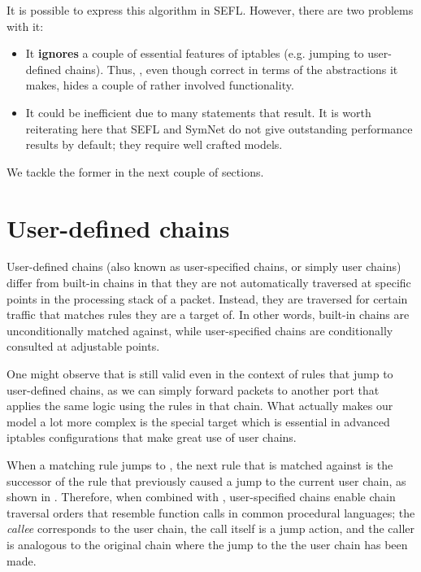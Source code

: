 It is possible to express this algorithm in SEFL.  However, there are two
problems with it:
\begin{itemize}
  \item It \textbf{ignores} a couple of essential features of iptables (e.g.
    jumping to user-defined chains).  Thus,
    , even though correct in terms of the
    abstractions it makes, hides a couple of rather involved functionality.
  \item It could be inefficient due to many  statements
    that result.  It is worth reiterating here that SEFL and SymNet do not give
    outstanding performance results by default; they require well crafted
    models.
\end{itemize}

We tackle the former in the next couple of sections.


\section{User-defined chains}

User-defined chains (also known as user-specified chains, or simply user chains)
differ from built-in chains in that they are not automatically traversed at
specific points in the processing stack of a packet.  Instead, they are
traversed for certain traffic that matches rules they are a target of.  In
other words, built-in chains are unconditionally matched against, while
user-specified chains are conditionally consulted at adjustable points.

One might observe that  is still
valid even in the context of rules that jump to user-defined chains, as we can
simply forward packets to another port that applies the same logic using the
rules in that chain.  What actually makes our model a lot more complex is the
special \RETURN target which is essential in advanced iptables configurations
that make great use of user chains.

When a matching rule jumps to \RETURN, the next rule that is matched against is
the successor of the rule that previously caused a jump to the current user
chain, as shown in .
Therefore, when combined with \RETURN, user-specified chains enable chain
traversal orders that resemble function calls in common procedural languages;
the \emph{callee} corresponds to the user chain, the call itself is a jump
action, and the caller is analogous to the original chain where the jump to the
the user chain has been made.

